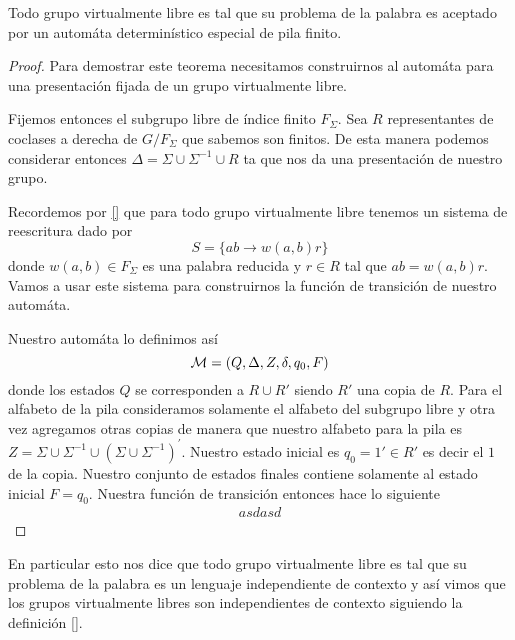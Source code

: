 \documentclass[tesis.tex]{subfiles}
\begin{document}
\begin{teo}
	Todo grupo virtualmente libre es tal que su problema de la palabra es aceptado por un automáta determinístico especial de pila finito.
\end{teo}

\begin{proof}
	Para demostrar este teorema necesitamos construirnos al automáta para una presentación fijada de un grupo virtualmente libre.
	
	Fijemos entonces el subgrupo libre de índice finito $F_\Sigma$. Sea $R$ representantes de coclases a derecha de $G/F_\Sigma$ que sabemos son finitos. De esta manera podemos considerar entonces $\Delta = \Sigma \cup \Sigma^{-1} \cup R$ ta que nos da una presentación de nuestro grupo.
	
	Recordemos por \ref{} que para todo grupo virtualmente libre tenemos un sistema de reescritura dado por 
	\[
	S = \{ ab \to w(a,b)r  \}
	\] 
	donde $w(a,b) \in F_\Sigma$ es una palabra reducida y $r \in R$ tal que $ab = w(a,b)r$. Vamos a usar este sistema para construirnos la función de transición de nuestro automáta. 
	
	Nuestro automáta lo definimos así 
	\[
	{\cal M }= (Q,\Delta, Z, \delta, q_0, F)
	\]
	donde los estados $Q$ se corresponden a $R \cup R'$ siendo $R'$ una copia de $R$. Para el alfabeto de la pila consideramos solamente el alfabeto del subgrupo libre y otra vez agregamos otras copias de manera que nuestro alfabeto para la pila es $Z = \Sigma \cup \Sigma^{-1} \cup (\Sigma \cup \Sigma^{-1})^{'}$. Nuestro estado inicial es $q_0 = 1' \in R'$ es decir el $1$ de la copia. Nuestro conjunto de estados finales contiene solamente al estado inicial $F=q_0$. Nuestra función de transición entonces hace lo siguiente
	\begin{align*}
		asdasd
	\end{align*}
\end{proof}

\begin{obs}
	En particular esto nos dice que todo grupo virtualmente libre es tal que su problema de la palabra es un lenguaje independiente de contexto y así vimos que los grupos virtualmente libres son independientes de contexto siguiendo la definición [].
\end{obs}
	
\end{document}
